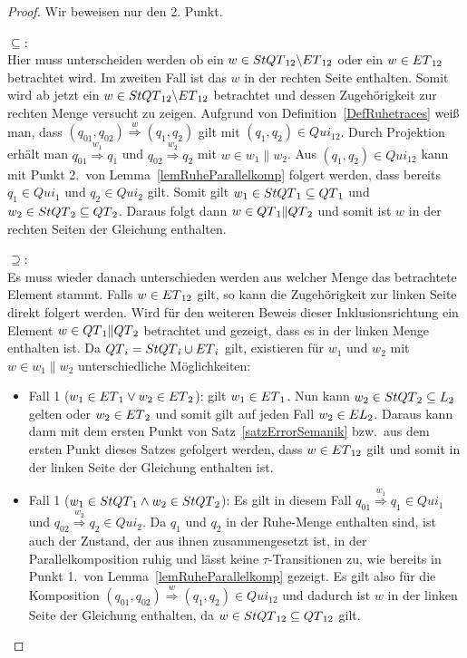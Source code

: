 \begin{proof}
  Wir beweisen nur den 2. Punkt.

  \glqq $\subseteq$\grqq :\\
  Hier muss unterscheiden werden ob ein $w\in StQT{}_{12}\backslash
  ET{}_{12}$ oder ein $w\in ET{}_{12}$ betrachtet wird. Im zweiten Fall ist das
  $w$ in der rechten Seite enthalten. Somit wird ab jetzt ein $w\in
  StQT{}_{12}\backslash ET{}_{12}$ betrachtet und dessen Zugehörigkeit zur
  rechten Menge versucht zu zeigen. Aufgrund von Definition~\ref{DefRuhetraces}
  weiß man, dass $(q_{01},q_{02}) \overset{w}{\Rightarrow} (q_1,q_2)$ gilt mit
  $(q_1,q_2)\in Qui_{12}$. Durch Projektion erhält man $q_{01}
  \overset{w_1}{\Rightarrow} q_1$ und $q_{02} \overset{w_2}{\Rightarrow} q_2$
  mit $w\in w_1\|w_2$. Aus $(q_1,q_2)\in Qui_{12}$ kann mit Punkt 2.\ von
  Lemma~\ref{lemRuheParallelkomp} folgert werden, dass bereits $q_1\in Qui_1$ und
  $q_2\in Qui_2$ gilt. Somit gilt $w_1\in StQT{}_1\subseteq QT{}_1$ und
  $w_2\in StQT{}_2\subseteq QT{}_2$. Daraus folgt dann $w\in
  QT{}_1\|QT{}_2$ und somit ist $w$ in der rechten Seiten der Gleichung
  enthalten.

  \glqq $\supseteq$\grqq :\\
  Es muss wieder danach unterschieden werden aus welcher Menge das betrachtete
  Element stammt. Falls $w\in ET{}_{12}$ gilt, so kann die
  Zugehörigkeit zur linken Seite direkt folgert werden. Wird für den
  weiteren Beweis dieser Inklusionsrichtung ein Element $w\in
  QT{}_1\|QT{}_2$ betrachtet und gezeigt, dass es in der linken Menge enthalten ist. Da
  $QT{}_i = StQT{}_i\cup ET{}_i$ gilt, existieren für $w_1$ und $w_2$ mit
  $w\in w_1\| w_2$ unterschiedliche Möglichkeiten:
  \begin{itemize}
    \item Fall 1 ($w_1\in ET{}_1\vee w_2\in ET{}_2$): \OBdA{} gilt
      $w_1\in ET{}_1$. Nun kann $w_2\in StQT{}_2\subseteq L_2$ gelten
      oder $w_2\in ET{}_2$ und somit gilt auf jeden Fall $w_2\in
      EL{}_2$. Daraus kann dann mit dem ersten Punkt von
      Satz~\ref{satzErrorSemanik} bzw.\ aus dem ersten Punkt dieses Satzes
      gefolgert werden, dass $w\in ET{}_{12}$ gilt und somit in der linken Seite der
      Gleichung enthalten ist.
    \item Fall 1 ($w_1\in StQT{}_1\wedge w_2\in StQT{}_2$): Es gilt in
      diesem Fall $q_{01} \overset{w_1}{\Rightarrow} q_1\in Qui_1$ und $q_{02}
      \overset{w_2}{\Rightarrow} q_2\in Qui_2$. Da $q_1$ und $q_2$ in der
      Ruhe-Menge enthalten sind, ist auch der Zustand, der aus ihnen
      zusammengesetzt ist, in der Parallelkomposition ruhig und lässt keine
      $\tau$-Transitionen zu, wie bereits in Punkt 1.\ von
      Lemma~\ref{lemRuheParallelkomp} gezeigt. Es gilt also für die Komposition
      $(q_{01},q_{02}) \overset{w}{\Rightarrow} (q_1,q_2)\in Qui_{12}$ und
      dadurch ist $w$ in der linken Seite der Gleichung enthalten, da $w\in
      StQT{}_{12}\subseteq QT{}_{12}$ gilt.
  \end{itemize}
\end{proof}

